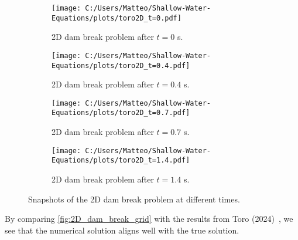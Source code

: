 \begin{figure}[H]
    \centering
    \begin{subfigure}{0.49\textwidth}
        \centering
        \texttt{[image: C:/Users/Matteo/Shallow-Water-Equations/plots/toro2D\_t=0.pdf]}
        \caption{2D dam break problem after $t=0$ s.}\label{fig:2D_dam_break_t0}
    \end{subfigure}
    \hfill
    \begin{subfigure}{0.49\textwidth}
        \centering
        \texttt{[image: C:/Users/Matteo/Shallow-Water-Equations/plots/toro2D\_t=0.4.pdf]}
        \caption{2D dam break problem after $t=0.4$ s.}\label{fig:2D_dam_break_t0.4}
    \end{subfigure}

    \vspace{0.5cm} %

    \begin{subfigure}{0.49\textwidth}
        \centering
        \texttt{[image: C:/Users/Matteo/Shallow-Water-Equations/plots/toro2D\_t=0.7.pdf]}
        \caption{2D dam break problem after $t=0.7$ s.}\label{fig:2D_dam_break_t0.7}
    \end{subfigure}
    \hfill
    \begin{subfigure}{0.49\textwidth}
        \centering
        \texttt{[image: C:/Users/Matteo/Shallow-Water-Equations/plots/toro2D\_t=1.4.pdf]}
        \caption{2D dam break problem after $t=1.4$ s.}\label{fig:2D_dam_break_t1.4}
    \end{subfigure}

    \caption{Snapshots of the 2D dam break problem at different times.}\label{fig:2D_dam_break_grid}
\end{figure}
By comparing \autoref{fig:2D_dam_break_grid} with the results from Toro (2024)~\cite{Toro2024}, we see that the numerical solution aligns well with the true solution.


